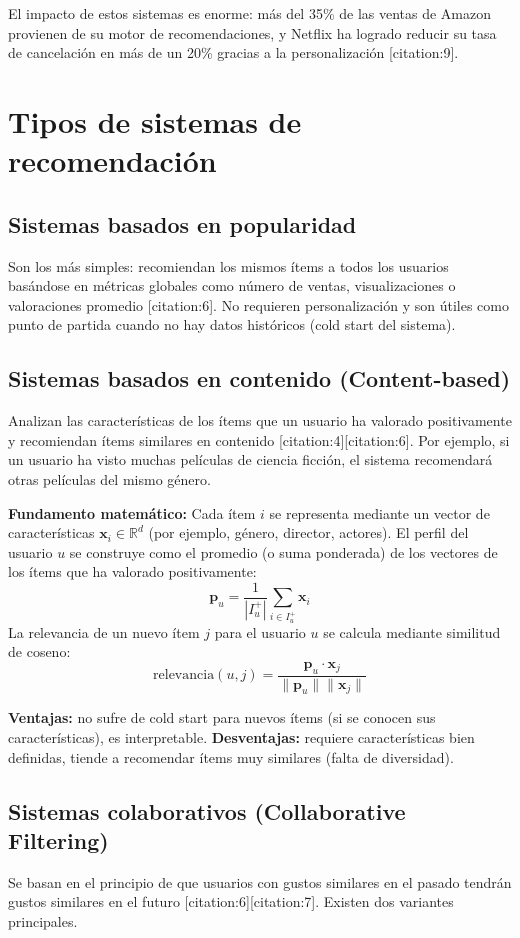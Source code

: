 \documentclass[12pt,a4paper,openany,oneside]{book}
\begin{document}
El impacto de estos sistemas es enorme: más del 35\% de las ventas de Amazon provienen de su motor de recomendaciones, y Netflix ha logrado reducir su tasa de cancelación en más de un 20\% gracias a la personalización [citation:9].

\section{Tipos de sistemas de recomendación}

\subsection{Sistemas basados en popularidad}
Son los más simples: recomiendan los mismos ítems a todos los usuarios basándose en métricas globales como número de ventas, visualizaciones o valoraciones promedio [citation:6]. No requieren personalización y son útiles como punto de partida cuando no hay datos históricos (cold start del sistema).

\subsection{Sistemas basados en contenido (Content-based)}
Analizan las características de los ítems que un usuario ha valorado positivamente y recomiendan ítems similares en contenido [citation:4][citation:6]. Por ejemplo, si un usuario ha visto muchas películas de ciencia ficción, el sistema recomendará otras películas del mismo género.

\textbf{Fundamento matemático:}
Cada ítem \(i\) se representa mediante un vector de características \(\mathbf{x}_i \in \mathbb{R}^d\) (por ejemplo, género, director, actores). El perfil del usuario \(u\) se construye como el promedio (o suma ponderada) de los vectores de los ítems que ha valorado positivamente:
\[
\mathbf{p}_u = \frac{1}{|I_u^+|}\sum_{i \in I_u^+} \mathbf{x}_i
\]
La relevancia de un nuevo ítem \(j\) para el usuario \(u\) se calcula mediante similitud de coseno:
\[
\text{relevancia}(u,j) = \frac{\mathbf{p}_u \cdot \mathbf{x}_j}{\|\mathbf{p}_u\| \|\mathbf{x}_j\|}
\]

\textbf{Ventajas:} no sufre de cold start para nuevos ítems (si se conocen sus características), es interpretable. \textbf{Desventajas:} requiere características bien definidas, tiende a recomendar ítems muy similares (falta de diversidad).

\subsection{Sistemas colaborativos (Collaborative Filtering)}
Se basan en el principio de que usuarios con gustos similares en el pasado tendrán gustos similares en el futuro [citation:6][citation:7]. Existen dos variantes principales.
\end{document}
